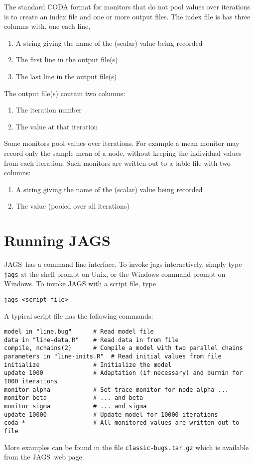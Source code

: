 \documentclass[11pt, a4paper, titlepage]{report}
\newcommand{\JAGS}{\textsf{JAGS}}
\begin{document}
The standard CODA format for monitors that do not pool values over
iterations is to create an index file and one or more output files.
The index file is has three columns with, one each line,
\begin{enumerate}
\item A string giving the name of the (scalar) value being recorded
\item The first line in the output file(s)
\item The last line in the output file(s)
\end{enumerate}
The output file(s) contain two columns:
\begin{enumerate}
\item The iteration number
\item The value at that iteration
\end{enumerate}

Some monitors pool values over iterations. For example a mean monitor
may record only the sample mean of a node, without keeping the
individual values from each iteration. Such monitors are written out
to a table file with two columns:
\begin{enumerate}
\item A string giving the name of the (scalar) value being recorded
\item The value (pooled over all iterations)
\end{enumerate}

\chapter{Running \JAGS}

\JAGS\ has a command line interface. To invoke jags interactively,
simply type \texttt{jags} at the shell prompt on Unix, or the Windows
command prompt on Windows. To invoke JAGS with a script file, type
\begin{verbatim}
jags <script file>
\end{verbatim}
A typical script file has the following commands: 
\begin{verbatim}
model in "line.bug"      # Read model file
data in "line-data.R"    # Read data in from file
compile, nchains(2)      # Compile a model with two parallel chains
parameters in "line-inits.R"  # Read initial values from file
initialize               # Initialize the model
update 1000              # Adaptation (if necessary) and burnin for 1000 iterations
monitor alpha            # Set trace monitor for node alpha ...
monitor beta             # ... and beta
monitor sigma            # ... and sigma
update 10000             # Update model for 10000 iterations
coda *                   # All monitored values are written out to file
\end{verbatim}
More examples can be found in the file \verb+classic-bugs.tar.gz+ which is
available from the \JAGS\ web page.
\end{document}
